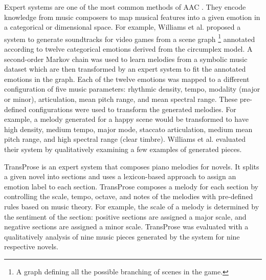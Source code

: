 Expert systems are one of the most common methods of AAC \cite{williams2015investigating}. They encode knowledge from music composers to map musical features into a given emotion in a categorical or dimensional space. For example, Williams et al. \cite{williams2015dynamic} proposed a system to generate soundtracks for video games from a scene graph \footnote{A graph defining all the possible branching of scenes in the game.} annotated according to twelve categorical emotions derived from the circumplex model. A second-order Markov chain was used to learn melodies from a symbolic music dataset which are then transformed by an expert system to fit the annotated emotions in the graph. Each of the twelve emotions was mapped to a different configuration of five music parameters: rhythmic density, tempo, modality (major or minor), articulation, mean pitch range, and mean spectral range. These pre-defined configurations were used to transform the generated melodies. For example, a melody generated for a happy scene would be transformed to have high density, medium tempo, major mode, staccato articulation, medium mean pitch range, and high spectral range (clear timbre).
Williams et al. \cite{williams2015dynamic} evaluated their system by qualitatively examining a few examples of generated pieces.

TransProse \cite{davis2014generating} is an expert system that composes piano melodies for novels. It splits a given novel into sections and uses a lexicon-based approach to assign an emotion label to each section. TransProse composes a melody for each section by controlling the scale, tempo, octave, and notes of the melodies with pre-defined rules based on music theory. For example, the scale of a melody is determined by the sentiment of the section: positive sections are assigned a major scale, and negative sections are assigned a minor scale. TransProse was evaluated with a qualitatively analysis of nine music pieces generated by the system for nine respective novels.


